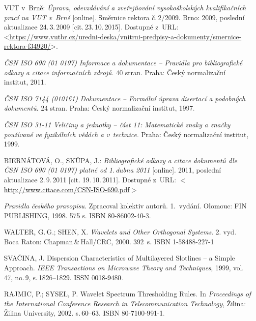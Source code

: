 

\begin{thebibliography}{99}
	
		VUT v~Brně:
    \emph{Úprava, odevzdávání a zveřejňování vysokoškolských kva\-li\-fi\-kač\-ních prací na VUT v~Brně}\/ [online].
		Směrnice rektora č.\,2/2009.
		Brno: 2009, po\-sled\-ní aktualizace 24.\,3.\,2009 [cit.\,23.\,10.\,2015].
    Dostupné z~URL:\\
    <\url{https://www.vutbr.cz/uredni-deska/vnitrni-predpisy-a-dokumenty/smernice-rektora-f34920/}>.

    \emph{ČSN ISO 690 (01 0197) Informace a dokumentace -- Pravidla pro bibliografické odkazy a citace informačních zdrojů.}
    40 stran. Praha: Český normalizační institut, 2011.

    \emph{ČSN ISO 7144 (010161) Dokumentace -- Formální úprava disertací a podobných dokumentů.}
    24 stran. Praha: Český normalizační institut, 1997.

    \emph{ČSN ISO 31-11 Veličiny a jednotky -- část 11: Matematické znaky a značky používané ve fyzikálních vědách a v~technice.}
    Praha: Český normalizační institut, 1999.

    BIERNÁTOVÁ, O., SKŮPA, J.:
    \emph{Bibliografické odkazy a citace dokumentů dle ČSN ISO 690 (01 0197) platné od 1.\,dubna 2011}\/ [online].
    2011, poslední aktualizace 2.\,9.\,2011 [cit. 19.\,10.\,2011].
    Dostupné z~URL:
    \(<\)\url{http://www.citace.com/CSN-ISO-690.pdf}\(>\)

    \emph{Pravidla českého pravopisu}.
    Zpracoval kolektiv autorů. 1.\ vydání.
    Olomouc: FIN PUB\-LISH\-ING, 1998. 575 s. ISBN 80-86002-40-3.

	WALTER, G.\,G.; SHEN, X.
	\emph{Wavelets and Other Orthogonal Systems}.
	2. vyd. Boca Raton: Chapman\,\&\,Hall/CRC, 2000. 392~s. ISBN 1-58488-227-1

	SVAČINA, J.
	Dispersion Characteristics of Multilayered Slotlines -- a Simple Approach.
	\emph{IEEE Transactions on Microwave Theory and Techniques},
	1999, vol.\,47, no.\,9, s.\,1826--1829. ISSN 0018-9480.

    RAJMIC, P.; SYSEL, P.
    Wavelet Spectrum Thresholding Rules.
    In \emph{Proceedings of the International Conference Research in Telecommunication Technology},
    Žilina: Žilina University, 2002. s.\,60--63. ISBN 80-7100-991-1.

\end{thebibliography}


